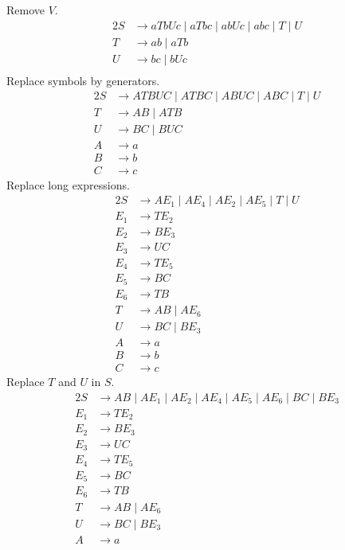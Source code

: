 \documentclass[docid=PA09]{tcom_PA}
\begin{document}
{Remove $V$.
\begin{alignat*}{2}
	S &\rightarrow aTbUc\mid aTbc\mid abUc\mid abc\mid T\mid U\\
	T &\rightarrow ab\mid aTb\\
	U &\rightarrow bc\mid bUc\\
\end{alignat*}
Replace symbols by generators.
\begin{alignat*}{2}
	S &\rightarrow ATBUC\mid ATBC\mid ABUC\mid ABC\mid T\mid U\\
	T &\rightarrow AB\mid ATB\\
	U &\rightarrow BC\mid BUC\\
	A &\rightarrow a\\
	B &\rightarrow b\\
	C &\rightarrow c
\end{alignat*}
Replace long expressions.
\begin{alignat*}{2}
	S   &\rightarrow AE_1\mid AE_4\mid AE_2\mid AE_5\mid T\mid U\\
	E_1 &\rightarrow TE_2\\
	E_2 &\rightarrow BE_3\\
	E_3 &\rightarrow UC\\
	E_4 &\rightarrow TE_5\\
	E_5 &\rightarrow BC\\
	E_6 &\rightarrow TB\\
	T   &\rightarrow AB\mid AE_6\\
	U   &\rightarrow BC\mid BE_3\\
	A   &\rightarrow a\\
	B   &\rightarrow b\\
	C   &\rightarrow c
\end{alignat*}
Replace $T$ and $U$ in $S$.
\begin{alignat*}{2}
	S   &\rightarrow AB\mid AE_1\mid AE_2\mid AE_4\mid AE_5\mid AE_6\mid BC\mid BE_3\\
	E_1 &\rightarrow TE_2\\
	E_2 &\rightarrow BE_3\\
	E_3 &\rightarrow UC\\
	E_4 &\rightarrow TE_5\\
	E_5 &\rightarrow BC\\
	E_6 &\rightarrow TB\\
	T   &\rightarrow AB\mid AE_6\\
	U   &\rightarrow BC\mid BE_3\\
	A   &\rightarrow a\\

\end{alignat*}}
\end{document}
